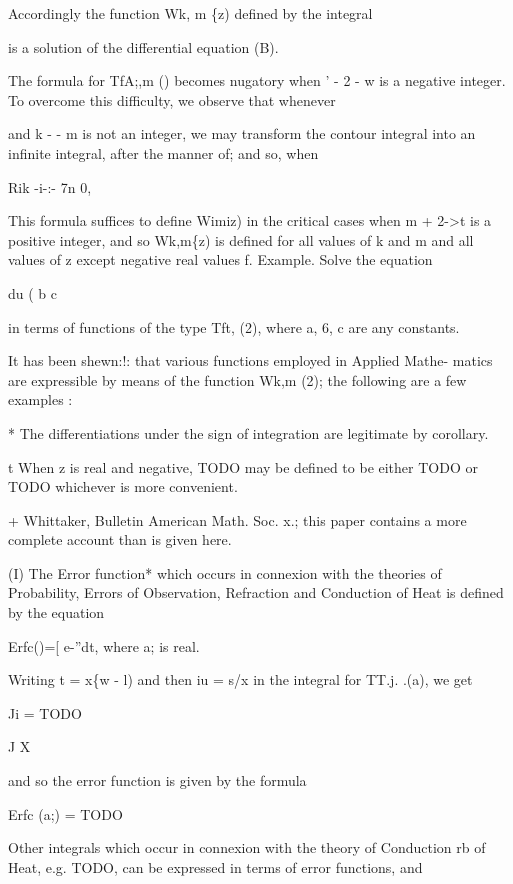 Accordingly the function Wk, m \{z) defined by the integral

is a solution of the differential equation (B).

The formula for TfA;,m () becomes nugatory when ' - 2 - w is a
negative integer. To overcome this difficulty, we observe that
whenever

and k - - m is not an integer, we may transform the contour integral
into an infinite integral, after the manner of; and so, when

Rik -i-:- 7n 0,

This formula suffices to define Wimiz) in the critical cases when m
+ 2->t is a positive integer, and so Wk,m\{z) is defined for all
values of k and m and all values of z except negative real values f.
Example. Solve the equation

du ( b c 

in terms of functions of the type Tft, (2), where a, 6, c are any
constants.


It has been shewn:!: that various functions employed in Applied Mathe-
matics are expressible by means of the function Wk,m (2); the
following are a few examples :

* The differentiations under the sign of integration are legitimate by corollary.

t When z is real and negative, TODO may be defined to be either TODO
or TODO whichever is more convenient.

+ Whittaker, Bulletin American Math. Soc. x.; this paper contains a
more complete account than is given here.

%
%
(I) The Error function* which occurs in connexion with the theories of
Probability, Errors of Observation, Refraction and Conduction of Heat
is defined by the equation

Erfc()=[ e-''dt, where a; is real.

Writing t = x\{w - l) and then iu = s/x in the integral for TT.j.
.(a), we get

Ji = TODO

J X

and so the error function is given by the formula

Erfc (a;) = TODO

Other integrals which occur in connexion with the theory of Conduction
rb of Heat, e.g. TODO, can be expressed in terms of error functions,
and

